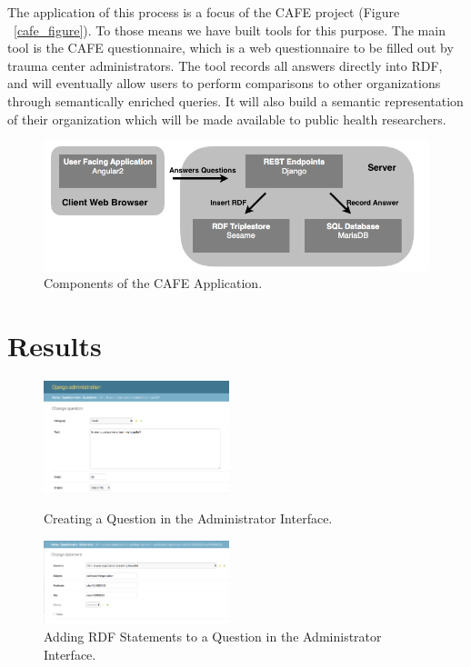 \documentclass{amia}
\begin{document}
The application of this process is a focus of the CAFE project (Figure ~\ref{cafe_figure}).
To those means we have built tools for this purpose.
The main tool is the CAFE questionnaire, which is a web questionnaire to be filled out by trauma center administrators.
The tool records all answers directly into RDF, and will eventually allow users to perform comparisons to other organizations through semantically enriched queries.
It will also build a semantic representation of their organization which will be made available to public health researchers.

\begin{figure}[h]
  \centering
  \includegraphics[width=1\textwidth]{pics/cafe_process.png}
  \caption{Components of the CAFE Application.}
  \label{cafe_process}
\end{figure}

\pagebreak

\section*{Results}
\begin{figure}
  \begin{center}
    \includegraphics[width=0.48\textwidth]{pics/161_question_admin.png}
  \end{center}
  \caption{Creating a Question in the Administrator Interface.}
  \label{161_question_admin}
  \vspace{5mm}  
   \begin{center}
    \includegraphics[width=0.48\textwidth]{pics/161_statement_admin.png}
  \end{center}
  \caption{Adding RDF Statements to a Question in the Administrator Interface.}
  \label{161_statement_admin}
\end{figure}
\end{document}
